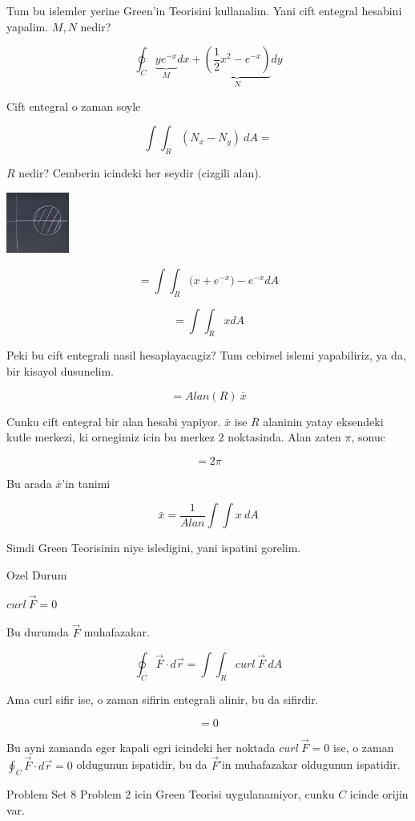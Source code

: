 \documentclass[12pt,fleqn]{article}\usepackage{../common}
\begin{document}
Tum bu islemler yerine Green'in Teorisini kullanalim. Yani cift entegral
hesabini yapalim. $M,N$ nedir? 

\[ \oint_C 
\underbrace{ye^{-x}}_{M} dx + 
\underbrace{(\frac{1}{2}x^2 - e^{-x})}_{N}dy \]

Cift entegral o zaman soyle

\[ \int \int_R (N_x - N_y) \ dA =
\]

$R$ nedir? Cemberin icindeki her seydir (cizgili alan). 

\includegraphics[height=2cm]{22_2.png}

\[=  \int \int_R  \bigg( x+ e^{-x} \bigg) - e^{-x} dA \]

\[=  \int \int_R  x dA \]

Peki bu cift entegrali nasil hesaplayacagiz? Tum cebirsel islemi
yapabiliriz, ya da, bir kisayol dusunelim. 

\[ = Alan(R) \ \bar{x} \]

Cunku cift entegral bir alan hesabi yapiyor. $\bar{x}$ ise $R$ alaninin
yatay eksendeki kutle merkezi, ki ornegimiz icin bu merkez 2
noktasinda. Alan zaten $\pi$, sonuc

\[ = 2\pi \]

Bu arada $\bar{x}$'in tanimi

\[ \bar{x} = \frac{1}{Alan} \int \int x \ dA \]


Simdi Green Teorisinin niye isledigini, yani ispatini gorelim. 

Ozel Durum 

$curl \ \vec{F} = 0$

Bu durumda $\vec{F}$ muhafazakar. 

\[ \oint_C \vec{F} \cdot d\vec{r} = \int \int_R curl \ \vec{F} \ dA \]

Ama curl sifir ise, o zaman sifirin entegrali alinir, bu da sifirdir. 

\[ = 0 \]

Bu ayni zamanda eger kapali egri icindeki her noktada $curl \ \vec{F} = 0$ ise, o
zaman $\oint_C \vec{F} \cdot d\vec{r} = 0$ oldugunun ispatidir, bu da $\vec{F}$'in muhafazakar oldugunun
ispatidir. 

Problem Set 8 Problem 2 icin Green Teorisi uygulanamiyor, cunku $C$
icinde orijin var. 
\end{document}
